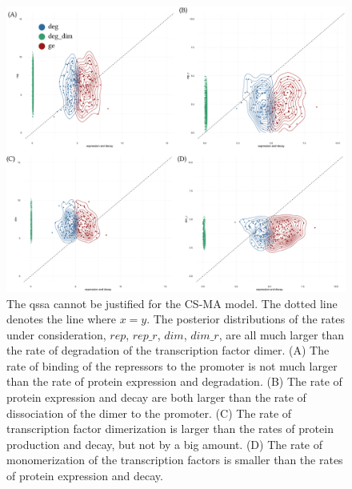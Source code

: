 \begin{figure}[htbp]
\begin{center}
\includegraphics[width=\textwidth]{../../chapters/chapterStabilityFinder/images/qssa-cs-sym.png}
\caption[Testing the QSSA assumptions on the mass action models]{ \label{fig:ma_qssa}The \acrshort{qssa} cannot be justified for the CS-MA model. The dotted line denotes the line where $x = y$. The posterior distributions of the rates under consideration, $rep$, $rep\_r$, $dim$, $dim\_r$, are all much larger than the rate of degradation of the transcription factor dimer. (A) The rate of binding of the repressors to the promoter is not much larger than the rate of protein expression and degradation. (B) The rate of protein expression and decay are both larger than the rate of dissociation of the dimer to the promoter. (C) The rate of transcription factor dimerization is larger than the rates of protein production and decay, but not by a big amount. (D) The rate of monomerization of the transcription factors is smaller than the rates of protein expression and decay.}
\end{center}
\end{figure}
\clearpage



